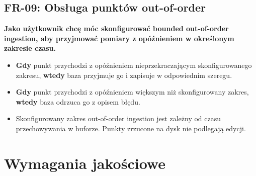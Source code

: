 \documentclass[12pt,a4paper]{article}
\begin{document}
\subsection*{FR-09: Obsługa punktów out-of-order}

\textbf{Jako użytkownik chcę móc skonfigurować bounded out-of-order ingestion, aby przyjmować pomiary z opóźnieniem w określonym zakresie czasu.}

\begin{itemize}
    \item \textbf{Gdy} punkt przychodzi z opóźnieniem nieprzekraczającym skonfigurowanego zakresu, \textbf{wtedy} baza przyjmuje go i zapisuje w odpowiednim szeregu.
    \item \textbf{Gdy} punkt przychodzi z opóźnieniem większym niż skonfigurowany zakres, \textbf{wtedy} baza odrzuca go z opisem błędu.
    \item Skonfigurowany zakres out-of-order ingestion jest zależny od czasu przechowywania w buforze. Punkty zrzucone na dysk nie podlegają edycji.
\end{itemize}

\section{Wymagania jakościowe}
\end{document}
